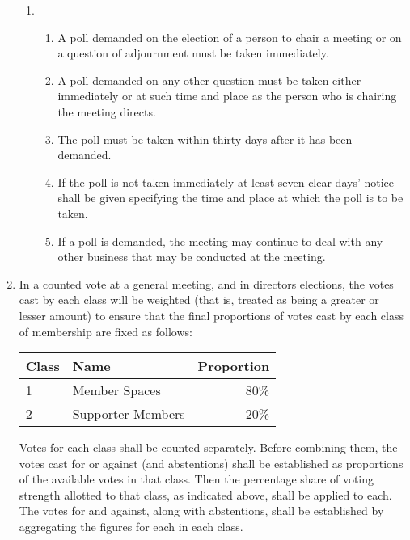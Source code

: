 \begin{enumerate}
\begin{enumerate}
  \item
    \begin{enumerate}
    \item
      A poll demanded on the election of a person to chair a meeting or
      on a question of adjournment must be taken immediately.
    \item
      A poll demanded on any other question must be taken either
      immediately or at such time and place as the person who is chairing
      the meeting directs.
    \item
      The poll must be taken within thirty days after it has been
      demanded.
    \item
      If the poll is not taken immediately at least seven clear days'
      notice shall be given specifying the time and place at which the
      poll is to be taken.
    \item
      If a poll is demanded, the meeting may continue to deal with any
      other business that may be conducted at the meeting.
    \end{enumerate}
\end{enumerate}
\item\label{vote-weighting}
    In a counted vote at a general meeting, and in directors elections,
    the votes cast by each class will be weighted (that is, treated as
    being a greater or lesser amount) to ensure that the final
    proportions of votes cast by each class of membership are fixed as
    follows:

    \begin{tabular}{l l r}
      \toprule
      \textbf{Class} & \textbf{Name} & \textbf{Proportion} \\
      \midrule
      1 & Member Spaces & 80\% \\
      2 & Supporter Members & 20\% \\
      \bottomrule
    \end{tabular}

    Votes for each class shall be counted separately. Before combining them,
    the votes cast for or against (and abstentions) shall be established as
    proportions of the available votes in that class. Then the percentage
    share of voting strength allotted to that class, as indicated above,
    shall be applied to each. The votes for and against, along with
    abstentions, shall be established by aggregating the figures for each in
    each class.


\end{enumerate}
